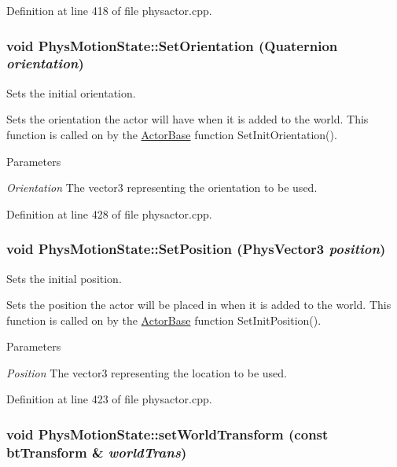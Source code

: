 Definition at line 418 of file physactor.cpp.

\hypertarget{classPhysMotionState_a3de0041d9fd078dcdea0db97a1c9e3e2}{
\subsubsection[{SetOrientation}]{\setlength{\rightskip}{0pt plus 5cm}void PhysMotionState::SetOrientation ({\bf Quaternion} {\em orientation})}}
\label{d2/d14/classPhysMotionState_a3de0041d9fd078dcdea0db97a1c9e3e2}


Sets the initial orientation. 

Sets the orientation the actor will have when it is added to the world. This function is called on by the \hyperlink{classActorBase}{ActorBase} function SetInitOrientation(). 
\begin{DoxyParams}{Parameters}
\item[{\em Orientation}]The vector3 representing the orientation to be used. \end{DoxyParams}


Definition at line 428 of file physactor.cpp.

\hypertarget{classPhysMotionState_aa2fa4f107147626cd33d42fd3fbe178b}{
\subsubsection[{SetPosition}]{\setlength{\rightskip}{0pt plus 5cm}void PhysMotionState::SetPosition ({\bf PhysVector3} {\em position})}}
\label{d2/d14/classPhysMotionState_aa2fa4f107147626cd33d42fd3fbe178b}


Sets the initial position. 

Sets the position the actor will be placed in when it is added to the world. This function is called on by the \hyperlink{classActorBase}{ActorBase} function SetInitPosition(). 
\begin{DoxyParams}{Parameters}
\item[{\em Position}]The vector3 representing the location to be used. \end{DoxyParams}


Definition at line 423 of file physactor.cpp.

\hypertarget{classPhysMotionState_a57c23b922e2c5e8af87dc1318796ec8b}{
\subsubsection[{setWorldTransform}]{\setlength{\rightskip}{0pt plus 5cm}void PhysMotionState::setWorldTransform (const btTransform \& {\em worldTrans})}}
\label{d2/d14/classPhysMotionState_a57c23b922e2c5e8af87dc1318796ec8b}


